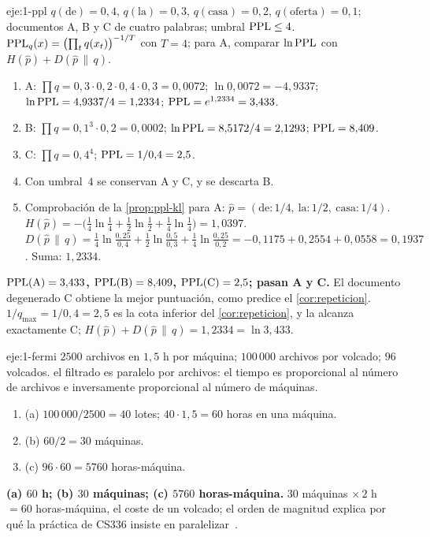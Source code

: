 \begin{solucion}{eje:1-ppl}
\datos $q(\text{de})=0{,}4$, $q(\text{la})=0{,}3$, $q(\text{casa})=0{,}2$, $q(\text{oferta})=0{,}1$; documentos A, B y C de cuatro palabras; umbral $\operatorname{PPL}\le 4$.
\planteamiento $\operatorname{PPL}_q(x)=\bigl(\prod_tq(x_t)\bigr)^{-1/T}$ con $T=4$; para A, comparar $\ln\operatorname{PPL}$ con $H(\hat p)+D(\hat p\,\|\,q)$.
\pasos
\begin{enumerate}[label=\arabic*.]
  \item A: $\prod q=0{,}3\cdot 0{,}2\cdot 0{,}4\cdot 0{,}3=0{,}0072$; $\ln 0{,}0072=-4{,}9337$; $\ln\operatorname{PPL}=4{,}9337/4=1{,}2334$; $\operatorname{PPL}=e^{1{,}2334}=3{,}433$.
  \item B: $\prod q=0{,}1^{3}\cdot 0{,}2=0{,}0002$; $\ln\operatorname{PPL}=8{,}5172/4=2{,}1293$; $\operatorname{PPL}=8{,}409$.
  \item C: $\prod q=0{,}4^{4}$; $\operatorname{PPL}=1/0{,}4=2{,}5$.
  \item Con umbral~$4$ se conservan A y C, y se descarta B.
  \item Comprobación de la \cref{prop:ppl-kl} para A: $\hat p=(\text{de}:1/4,\ \text{la}:1/2,\ \text{casa}:1/4)$. $H(\hat p)=-\bigl(\tfrac14\ln\tfrac14+\tfrac12\ln\tfrac12+\tfrac14\ln\tfrac14\bigr)=1{,}0397$. $D(\hat p\,\|\,q)=\tfrac14\ln\tfrac{0{,}25}{0{,}4}+\tfrac12\ln\tfrac{0{,}5}{0{,}3}+\tfrac14\ln\tfrac{0{,}25}{0{,}2}=-0{,}1175+0{,}2554+0{,}0558=0{,}1937$. Suma: $1{,}2334$.
\end{enumerate}
\resultado \textbf{$\operatorname{PPL}(\text{A})=3{,}433$, $\operatorname{PPL}(\text{B})=8{,}409$, $\operatorname{PPL}(\text{C})=2{,}5$; pasan A y C.} El documento degenerado C obtiene la mejor puntuación, como predice el \cref{cor:repeticion}.
\comprobacion $1/q_{\max}=1/0{,}4=2{,}5$ es la cota inferior del \cref{cor:repeticion}, y la alcanza exactamente C; $H(\hat p)+D(\hat p\,\|\,q)=1{,}2334=\ln 3{,}433$.
\end{solucion}

\begin{solucion}{eje:1-fermi}
\datos $2500$ archivos en $1{,}5$ h por máquina; $100\,000$ archivos por volcado; $96$ volcados.
\planteamiento el filtrado es paralelo por archivos: el tiempo es proporcional al número de archivos e inversamente proporcional al número de máquinas.
\pasos
\begin{enumerate}[label=\arabic*.]
  \item (a) $100\,000/2500=40$ lotes; $40\cdot 1{,}5=60$ horas en una máquina.
  \item (b) $60/2=30$ máquinas.
  \item (c) $96\cdot 60=5760$ horas-máquina.
\end{enumerate}
\resultado \textbf{(a) $60$ h; (b) $30$ máquinas; (c) $5760$ horas-máquina.}
\comprobacion $30$ máquinas $\times\,2$ h $=60$ horas-máquina, el coste de un volcado; el orden de magnitud explica por qué la práctica de CS336 insiste en paralelizar~\cite[§4]{cs336a4}.
\end{solucion}

